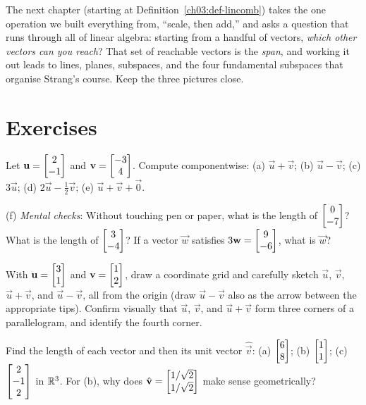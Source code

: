The next chapter (starting at Definition~\ref{ch03:def-lincomb}) takes the one operation
we built everything from, ``scale, then add,'' and asks a question that runs through all
of linear algebra: starting from a handful of vectors, \emph{which other vectors can you
reach}? That set of reachable vectors is the \emph{span}, and working it out leads to
lines, planes, subspaces, and the four fundamental subspaces that organise Strang's
course. Keep the three pictures close.

\section{Exercises}
\label{ch02:exercises}

\begin{exercise}
\label{ch02:exr-arith}
Let $\mathbf{u}=\begin{bmatrix}2\\-1\end{bmatrix}$ and $\mathbf{v}=\begin{bmatrix}-3\\4\end{bmatrix}$.
Compute componentwise:
(a) $\vec{u}+\vec{v}$; \quad
(b) $\vec{u}-\vec{v}$; \quad
(c) $3\vec{u}$; \quad
(d) $2\vec{u}-\tfrac12\vec{v}$; \quad
(e) $\vec{u}+\vec{v}+\vec{0}$.

\noindent
(f) \emph{Mental checks}: Without touching pen or paper, what is the length of $\begin{bmatrix}0\\-7\end{bmatrix}$?
What is the length of $\begin{bmatrix}3\\-4\end{bmatrix}$? If a vector $\vec{w}$ satisfies $3\mathbf{w}=\begin{bmatrix}9\\-6\end{bmatrix}$,
what is $\vec{w}$?
\end{exercise}

\begin{exercise}
\label{ch02:exr-parallelogram}
With $\mathbf{u}=\begin{bmatrix}3\\1\end{bmatrix}$ and $\mathbf{v}=\begin{bmatrix}1\\2\end{bmatrix}$, draw a coordinate grid and
carefully sketch $\vec{u}$, $\vec{v}$, $\vec{u}+\vec{v}$, and $\vec{u}-\vec{v}$, all from
the origin (draw $\vec{u}-\vec{v}$ also as the arrow between the appropriate tips). Confirm
visually that $\vec{u}$, $\vec{v}$, and $\vec{u}+\vec{v}$ form three corners of a
parallelogram, and identify the fourth corner.
\end{exercise}

\begin{exercise}[Normalizing]
\label{ch02:exr-normalize}
Find the length of each vector and then its unit vector $\hat{\vec{v}}$:
(a) $\begin{bmatrix}6\\8\end{bmatrix}$; \quad
(b) $\begin{bmatrix}1\\1\end{bmatrix}$; \quad
(c) $\begin{bmatrix}2\\-1\\2\end{bmatrix}$ in $\mathbb{R}^3$.
For (b), why does $\hat{\mathbf{v}}=\begin{bmatrix}1/\sqrt2 \\ 1/\sqrt2\end{bmatrix}$ make sense geometrically?
\end{exercise}

